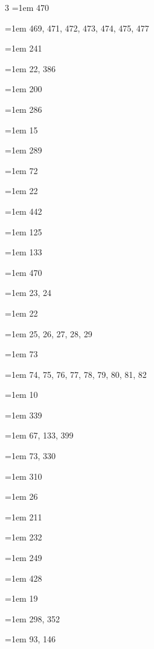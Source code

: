 \begin{multicols}{3}
\hangindent=1em  470\par
\hangindent=1em  469, 471, 472, 473, 474, 475, 477\par
\hangindent=1em  241\par
\hangindent=1em  22, 386\par
\hangindent=1em  200\par
\hangindent=1em  286\par
\hangindent=1em  15\par
\hangindent=1em  289\par
\hangindent=1em  72\par
\hangindent=1em  22\par
\hangindent=1em  442\par
\hangindent=1em  125\par
\hangindent=1em  133\par
\hangindent=1em  470\par
\hangindent=1em  23, 24\par
\hangindent=1em  22\par
\hangindent=1em  25, 26, 27, 28, 29\par
\hangindent=1em  73\par
\hangindent=1em  74, 75, 76, 77, 78, 79, 80, 81, 82\par
\hangindent=1em  10\par
\hangindent=1em  339\par
\hangindent=1em  67, 133, 399\par
\hangindent=1em  73, 330\par
\hangindent=1em  310\par
\hangindent=1em  26\par
\hangindent=1em  211\par
\hangindent=1em  232\par
\hangindent=1em  249\par
\hangindent=1em  428\par
\hangindent=1em  19\par
\hangindent=1em  298, 352\par
\hangindent=1em  93, 146\par

\end{multicols}
